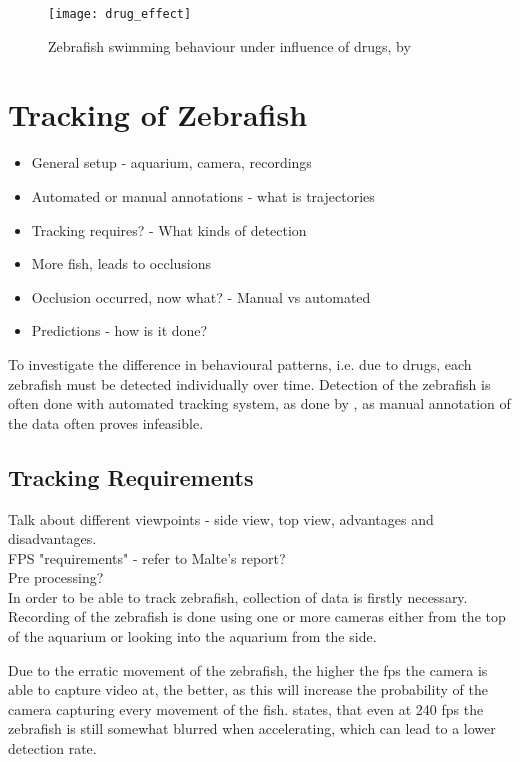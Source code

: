 \begin{figure}[h]
	\centering
	\texttt{[image: drug\_effect]}
	\caption{Zebrafish swimming behaviour under influence of drugs, by \cite{Stewart2015}}
	\label{fig:drug_effect}
\end{figure}



\section{Tracking of Zebrafish}

\begin{itemize}
	\item General setup - aquarium, camera, recordings
	\item Automated or manual annotations - what is trajectories
	\item Tracking requires? - What kinds of detection
	\item More fish, leads to occlusions
	\item Occlusion occurred, now what? - Manual vs automated
	\item Predictions - how is it done?	
\end{itemize}

To investigate the difference in behavioural patterns, i.e. due to drugs, each zebrafish must be detected individually over time. Detection of the zebrafish is often done with automated tracking system, as done by \cite{Stewart2015}, as manual annotation of the data often proves infeasible.

\subsection{Tracking Requirements}
Talk about different viewpoints - side view, top view, advantages and disadvantages.\\
FPS "requirements" - refer to Malte's report?\\
Pre processing?\\

In order to be able to track zebrafish, collection of data is firstly necessary. Recording of the zebrafish is done using one or more cameras either from the top of the aquarium or looking into the aquarium from the side.

Due to the erratic movement of the zebrafish, the higher the \gls{fps} the camera is able to capture video at, the better, as this will increase the probability of the camera capturing every movement of the fish. \cite{Pedersen2017} states, that even at 240 \gls{fps} the zebrafish is still somewhat blurred when accelerating, which can lead to a lower detection rate.

